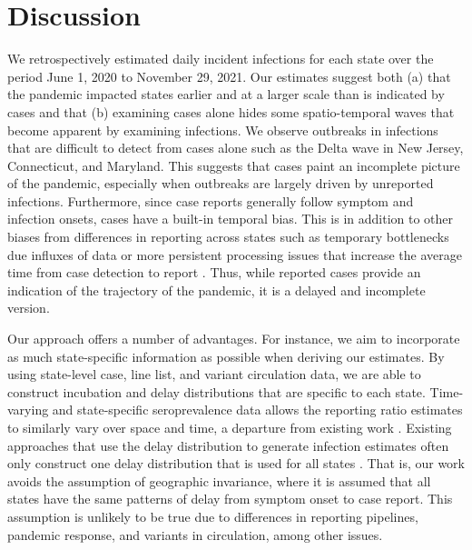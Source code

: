 \section{Discussion}

We retrospectively estimated daily incident infections for each \US state over
the period June 1, 2020 to November 29, 2021. Our  estimates suggest both (a)
that the pandemic impacted states earlier and at a larger scale than is
indicated by cases and that (b) examining cases alone hides some spatio-temporal
waves that become apparent by examining infections. We observe outbreaks in
infections that are difficult to detect from cases alone such as the Delta wave
in New Jersey, Connecticut, and Maryland. This suggests that cases paint an
incomplete picture of the pandemic, especially when outbreaks are largely driven
by unreported infections. Furthermore, since case reports generally follow
symptom and infection onsets, cases have a built-in temporal bias. This is in
addition to other biases from differences in reporting across states such as
temporary bottlenecks due influxes of data or more persistent processing issues
that increase the average time from case detection to report
\citep{wash2020dash, dunkel2020covid19}. 
Thus, while reported cases provide an indication of the trajectory of the
pandemic, it is a delayed and incomplete version.


Our approach offers a number of advantages. For instance, we aim to incorporate
as much state-specific information as possible when deriving our estimates. By
using state-level case, line list, and variant circulation data, we are able to
construct incubation and delay distributions that are specific to each state.
Time-varying and state-specific seroprevalence data allows the reporting ratio
estimates to similarly vary over space and time, a departure from existing work
\citep{unwin2020state, uga2020covid19}. Existing approaches that use the delay
distribution to generate infection estimates often only construct one delay
distribution that is used for all states \citep{chitwood2022reconstructing,
jahja2022real}. That is, our work avoids the assumption of geographic
invariance, where it is assumed that all states have the same patterns of delay
from symptom onset to case report. This assumption is unlikely to be true due to
differences in reporting pipelines, pandemic response, and variants in
circulation, among other issues. 

